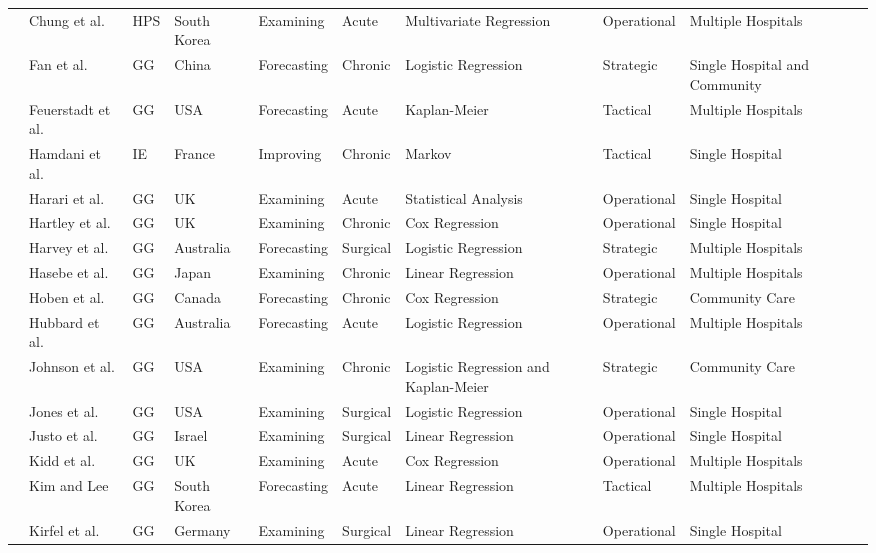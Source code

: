 \documentclass[thesis.tex]{subfiles}
\begin{document}
\begin{landscape}
\begin{table}[]
{\begin{tabular}{@{}llllllllll@{}}
    \cite{Chung2010} & Chung et al. & HPS & South Korea & Examining & Acute & Multivariate Regression & Operational & Multiple Hospitals \\
    \cite{Fan2021} & Fan et al. & GG & China & Forecasting & Chronic & Logistic Regression & Strategic & Single Hospital and Community \\
    \cite{Feuerstadt2022} & Feuerstadt et al. & GG & USA & Forecasting & Acute & Kaplan-Meier & Tactical & Multiple Hospitals \\
   \cite{Hamdani} & Hamdani et al. & IE& France & Improving &Chronic & Markov & Tactical & Single Hospital \\
    \cite{Harari2007} & Harari et al. & GG & UK & Examining & Acute & Statistical Analysis & Operational & Single Hospital \\
    \cite{Hartley2019} & Hartley et al. & GG & UK & Examining & Chronic & Cox Regression & Operational & Single Hospital \\
    \cite{Harvey2020} & Harvey et al. & GG & Australia & Forecasting & Surgical & Logistic Regression & Strategic & Multiple Hospitals \\ %
    \cite{Hasebe2018} & Hasebe et al. & GG & Japan & Examining & Chronic & Linear Regression & Operational & Multiple Hospitals \\
    \cite{Hoben2019} & Hoben et al. & GG & Canada & Forecasting & Chronic & Cox Regression & Strategic & Community Care \\
    \cite{Hubbard2017} & Hubbard et al. & GG & Australia & Forecasting & Acute & Logistic Regression & Operational & Multiple Hospitals \\
    \cite{Johnson2011} & Johnson et al. & GG & USA & Examining & Chronic & Logistic Regression and Kaplan-Meier & Strategic & Community Care \\
    \cite{Jones2021} & Jones et al. & GG & USA & Examining & Surgical & Logistic Regression & Operational & Single Hospital \\
    \cite{Justo2011} & Justo et al. & GG & Israel & Examining & Surgical & Linear Regression & Operational & Single Hospital \\
    \cite{Kidd2014} & Kidd et al. & GG & UK & Examining & Acute & Cox Regression & Operational & Multiple Hospitals \\
    \cite{Kim2018} & Kim and Lee & GG & South Korea & Forecasting & Acute & Linear Regression & Tactical & Multiple Hospitals \\ %
    \cite{Kirfel2021} & Kirfel et al. & GG & Germany & Examining & Surgical & Linear Regression & Operational & Single Hospital \\

\end{tabular}}
\end{table}
\end{landscape}
\end{document}

